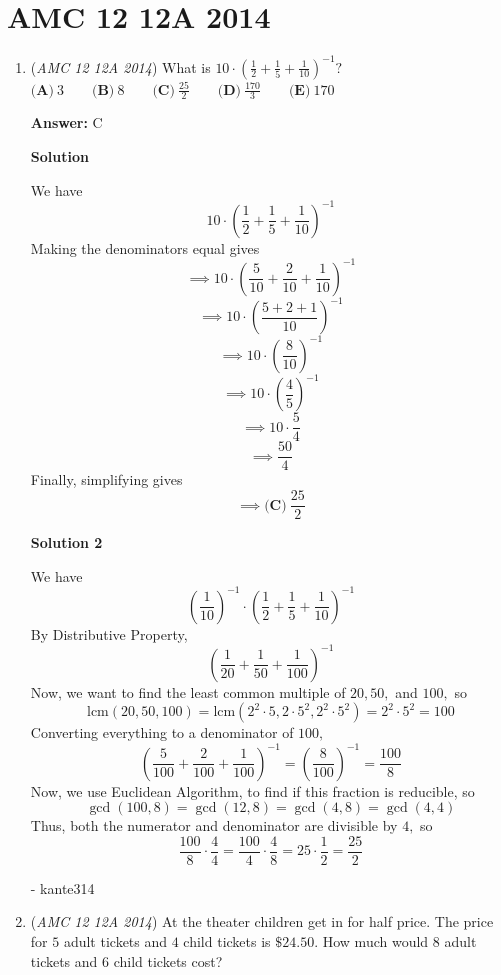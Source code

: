 \section{AMC 12 12A 2014}
        \begin{enumerate}
        	\item (\textit{AMC 12 12A 2014}) What is $10 \cdot \left(\frac{1}{2} + \frac{1}{5} + \frac{1}{10}\right)^{-1}?$
$\textbf{(A)}\ 3\qquad\textbf{(B)}\ 8\qquad\textbf{(C)}\ \frac{25}{2}\qquad\textbf{(D)}\ \frac{170}{3}\qquad\textbf{(E)}\ 170$

 \textbf{Answer: }C



\textbf{Solution}

We have 
 \[10\cdot\left(\frac{1}{2}+\frac{1}{5}+\frac{1}{10}\right)^{-1}\]Making the denominators equal gives
 \[\implies 10\cdot\left(\frac{5}{10}+\frac{2}{10}+\frac{1}{10}\right)^{-1}\]
 \[\implies 10\cdot\left(\frac{5+2+1}{10}\right)^{-1}\]
 \[\implies 10\cdot\left(\frac{8}{10}\right)^{-1}\]
 \[\implies 10\cdot\left(\frac{4}{5}\right)^{-1}\]
 \[\implies 10\cdot\frac{5}{4}\]
 \[\implies \frac{50}{4}\]Finally, simplifying gives
 \[\implies \boxed{\textbf{(C)}\ \frac{25}{2}}\]




\textbf{Solution 2}

We have
 \[\left(\frac{1}{10}\right)^{-1}\cdot \left(\frac{1}{2} + \frac{1}{5} + \frac{1}{10}\right)^{-1}\]By Distributive Property,
 \[\left(\frac{1}{20}+\frac{1}{50}+\frac{1}{100}\right)^{-1}\]Now, we want to find the least common multiple of $20, 50,$ and $100,$ so
 \[\text{lcm}(20,50,100)=\text{lcm}(2^2 \cdot 5,2 \cdot 5^2,2^2 \cdot 5^2)=2^2 \cdot 5^2=100\]Converting everything to a denominator of $100,$
 \[\left(\frac{5}{100}+\frac{2}{100}+\frac{1}{100}\right)^{-1}=\left(\frac{8}{100}\right)^{-1}=\frac{100}{8}\]Now, we use Euclidean Algorithm, to find if this fraction is reducible, so
 \[\gcd(100,8)=\gcd(12,8)=\gcd(4,8)=\gcd(4,4)\]Thus, both the numerator and denominator are divisible by $4,$ so
 \[\frac{100}{8} \cdot \frac{4}{4}=\frac{100}{4} \cdot \frac{4}{8}=25 \cdot \frac{1}{2}=\boxed{\frac{25}{2}}\]

 - kante314

 


 


 


	\item (\textit{AMC 12 12A 2014}) At the theater children get in for half price.  The price for $5$ adult tickets and $4$ child tickets is $\$24.50$.  How much would $8$ adult tickets and $6$ child tickets cost?



\end{enumerate}
